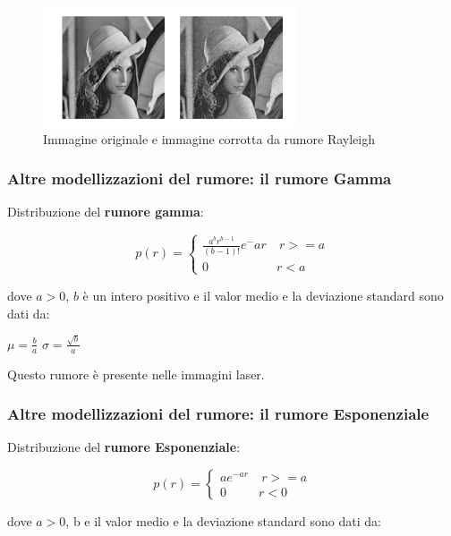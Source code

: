 \begin{figure}[H]
    \centering
    \includegraphics[width=\linewidth, keepaspectratio]{capitoli/immagini/imgs/esempio-rumore.png}
    \caption*{Immagine originale e immagine corrotta da rumore Rayleigh}
\end{figure}

\subsubsection{Altre modellizzazioni del rumore: il rumore Gamma}

Distribuzione del \textbf{rumore gamma}:

\begin{center}
    $$
        p(r) = \left\{ \begin{array}{cl}
            \frac{a^b r^{b-1}}{(b-1)!}e^-{ar} & \ r >= a \\
            0                                 & r<a
        \end{array} \right.
    $$
\end{center}

dove $a > 0$, $b$ è un intero positivo e il valor medio e la deviazione standard sono dati da:

\begin{center}
    $\mu=\frac{b}{a}$ $\sigma=\frac{\sqrt{b}}{a}$
\end{center}

Questo rumore è presente nelle immagini laser.

\subsubsection{Altre modellizzazioni del rumore: il rumore Esponenziale}

Distribuzione del \textbf{rumore Esponenziale}:

\begin{center}
    $$
        p(r) = \left\{ \begin{array}{cl}
            ae^{-ar} & \ r >= a \\
            0        & r<0
        \end{array} \right.
    $$
\end{center}
dove $a > 0$, b e il valor medio e la deviazione standard sono dati da:

